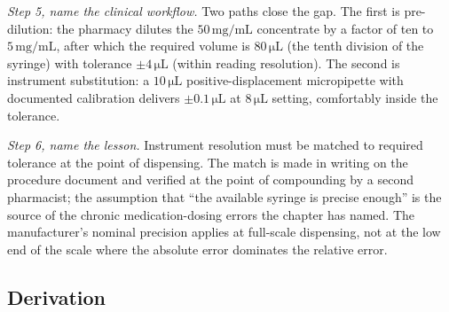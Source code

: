 \begin{exercise}
\textit{Step 5, name the clinical workflow.} Two paths close the gap.
The first is pre-dilution: the pharmacy dilutes the
$50 \,\si{\milli\gram\per\milli\liter}$ concentrate by a factor of
ten to $5 \,\si{\milli\gram\per\milli\liter}$, after which the
required volume is $80 \,\si{\micro\liter}$ (the tenth division of
the syringe) with tolerance $\pm 4 \,\si{\micro\liter}$ (within
reading resolution). The second is instrument substitution: a
$10 \,\si{\micro\liter}$ positive-displacement micropipette with
documented calibration delivers $\pm 0.1 \,\si{\micro\liter}$ at
$8 \,\si{\micro\liter}$ setting, comfortably inside the tolerance.

\textit{Step 6, name the lesson.} Instrument resolution must be
matched to required tolerance at the point of dispensing. The match
is made in writing on the procedure document and verified at the
point of compounding by a second pharmacist; the assumption that
``the available syringe is precise enough'' is the source of the
chronic medication-dosing errors the chapter has named. The
manufacturer's nominal precision applies at full-scale dispensing,
not at the low end of the scale where the absolute error dominates
the relative error.
\end{exercise}

\subsection*{Derivation}

